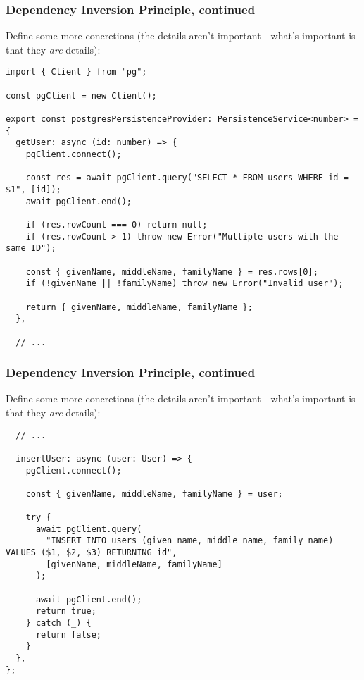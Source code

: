 \documentclass[aspectratio=169]{beamer}
\begin{document}
\begin{frame}[fragile]
  \frametitle{Dependency Inversion Principle, continued}
  Define some more concretions (the details aren't important---what's important
  is that they \emph{are} details):

  \vspace{1em}

  \begin{verbatim}
import { Client } from "pg";

const pgClient = new Client();

export const postgresPersistenceProvider: PersistenceService<number> = {
  getUser: async (id: number) => {
    pgClient.connect();

    const res = await pgClient.query("SELECT * FROM users WHERE id = $1", [id]);
    await pgClient.end();

    if (res.rowCount === 0) return null;
    if (res.rowCount > 1) throw new Error("Multiple users with the same ID");

    const { givenName, middleName, familyName } = res.rows[0];
    if (!givenName || !familyName) throw new Error("Invalid user");

    return { givenName, middleName, familyName };
  },

  // ...
  \end{verbatim}
\end{frame}

\begin{frame}[fragile]
  \frametitle{Dependency Inversion Principle, continued}
  Define some more concretions (the details aren't important---what's important
  is that they \emph{are} details):

  \vspace{1em}

  \begin{verbatim}
  // ...

  insertUser: async (user: User) => {
    pgClient.connect();

    const { givenName, middleName, familyName } = user;

    try {
      await pgClient.query(
        "INSERT INTO users (given_name, middle_name, family_name) VALUES ($1, $2, $3) RETURNING id",
        [givenName, middleName, familyName]
      );

      await pgClient.end();
      return true;
    } catch (_) {
      return false;
    }
  },
};
  \end{verbatim}
\end{frame}
\end{document}
